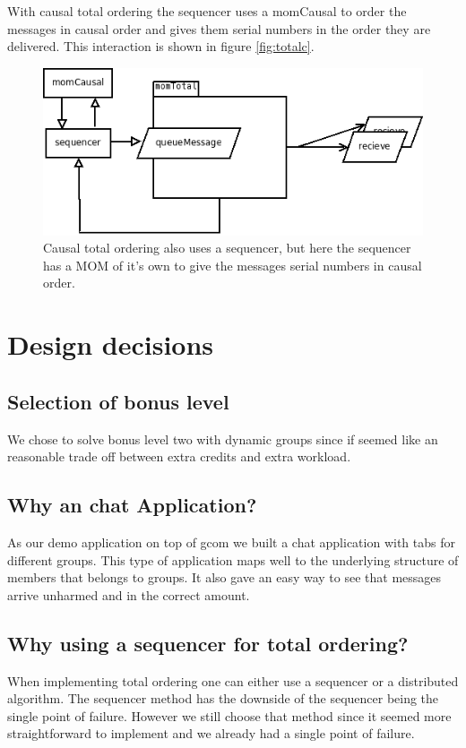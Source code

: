 \documentclass[english]{article}
\begin{document}
With causal total ordering the sequencer uses a momCausal to order the messages in causal order and gives them serial numbers in the order they are delivered. This interaction is shown in figure \vref{fig:totalc}.

\begin{figure}
\includegraphics[width=\textwidth]{momTotalC.png}
\caption{Causal total ordering also uses a sequencer, but here the sequencer has a MOM of it's own to give the messages serial numbers in causal order.}
\label{fig:totalc}
\end{figure}

\section{Design decisions}

\subsection{Selection of bonus level}
We chose to solve bonus level two with dynamic groups since if seemed like an reasonable trade off between extra credits and extra workload. 

\subsection{Why an chat Application?}
As our demo application on top of gcom we built a chat application with tabs for different groups. This type of application maps well to the underlying structure of members that belongs to groups. It also gave an easy way to see that messages arrive unharmed and in the correct amount. 

\subsection{Why using a sequencer for total ordering?}
When implementing total ordering one can either use a sequencer or a distributed algorithm. The sequencer method has the downside of the sequencer being the single point of failure. However we still choose that method since it seemed more straightforward to implement and we already had a single point of failure.
\end{document}
